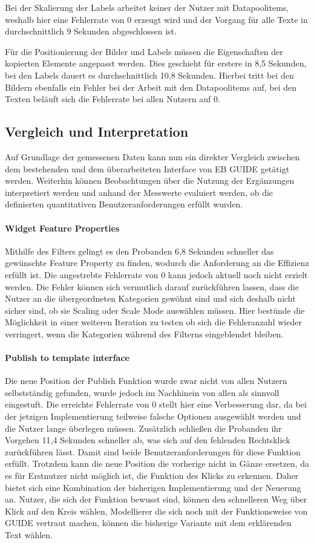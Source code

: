 Bei der Skalierung der Labels arbeitet keiner der Nutzer mit Datapoolitems, weshalb hier eine Fehlerrate von 0 erzeugt wird und der Vorgang für alle Texte in durchschnittlich 9 Sekunden abgeschlossen ist.

Für die Positionierung der Bilder und Labels müssen die Eigenschaften der kopierten Elemente angepasst werden.
Dies geschieht für erstere in 8,5 Sekunden, bei den Labels dauert es durchschnittlich 10,8 Sekunden.
Hierbei tritt bei den Bildern ebenfalls ein Fehler bei der Arbeit mit den Datapoolitems auf, bei den Texten beläuft sich die Fehlerrate bei allen Nutzern auf 0.

\subsection{Vergleich und Interpretation}Auf Grundlage der gemessenen Daten kann nun ein direkter Vergleich zwischen dem bestehenden und dem überarbeiteten Interface von EB GUIDE getätigt werden.
Weiterhin können Beobachtungen über die Nutzung der Ergänzungen interpretiert werden und anhand der Messwerte evaluiert werden, ob die definierten quantitativen Benutzeranforderungen erfüllt wurden.

\paragraph{Widget Feature Properties}
Mithilfe des Filters gelingt es den Probanden 6,8 Sekunden schneller das gewünschte Feature Property zu finden, wodurch die Anforderung an die Effizienz erfüllt ist.
Die angestrebte Fehlerrate von 0 kann jedoch aktuell noch nicht erzielt werden.
Die Fehler können sich vermutlich darauf zurückführen lassen, dass die Nutzer an die übergeordneten Kategorien gewöhnt sind und sich deshalb nicht sicher sind, ob sie Scaling oder Scale Mode auswählen müssen.
Hier bestünde die Möglichkeit in einer weiteren Iteration zu testen ob sich die Fehleranzahl wieder verringert, wenn die Kategorien während des Filterns eingeblendet bleiben.

\paragraph{Publish to template interface}
Die neue Position der Publish Funktion wurde zwar nicht von allen Nutzern selbstständig gefunden, wurde jedoch im Nachhinein von allen als sinnvoll eingestuft.
Die erreichte Fehlerrate von 0 stellt hier eine Verbesserung dar, da bei der jetzigen Implementierung teilweise falsche Optionen ausgewählt werden und die Nutzer lange überlegen müssen.
Zusätzlich schließen die Probanden ihr Vorgehen 11,4 Sekunden schneller ab, was sich auf den fehlenden Rechtsklick zurückführen lässt.
Damit sind beide Benutzeranforderungen für diese Funktion erfüllt.
Trotzdem kann die neue Position die vorherige nicht in Gänze ersetzen, da es für Erstnutzer nicht möglich ist, die Funktion des Klicks zu erkennen.
Daher bietet sich eine Kombination der bisherigen Implementierung und der Neuerung an.
Nutzer, die sich der Funktion bewusst sind, können den schnelleren Weg über Klick auf den Kreis wählen, Modellierer die sich noch mit der Funktionsweise von GUIDE vertraut machen, können die bisherige Variante mit dem erklärenden Text wählen.

